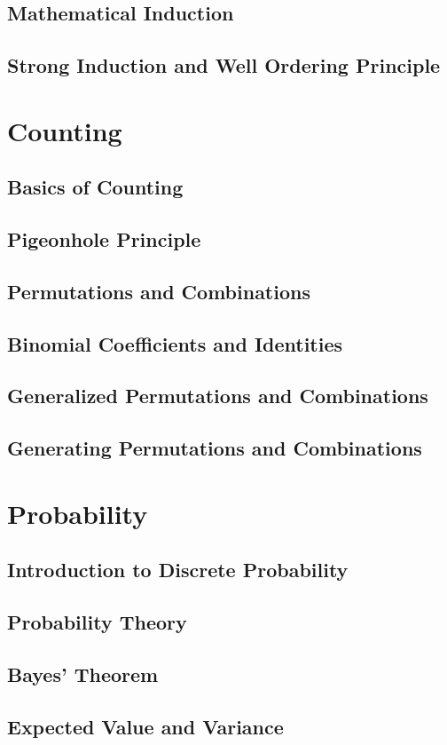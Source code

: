 \documentclass[article, 11pt]{article}
\theoremstyle{definition}
\begin{document}
    \subsection{Mathematical Induction}
    \subsection{Strong Induction and Well Ordering Principle}
    \section{Counting}
    \subsection{Basics of Counting}
    \subsection{Pigeonhole Principle}
    \subsection{Permutations and Combinations}
    \subsection{Binomial Coefficients and Identities}
    \subsection{Generalized Permutations and Combinations}
    \subsection{Generating Permutations and Combinations}
    \section{Probability}
    \subsection{Introduction to Discrete Probability}
    \subsection{Probability Theory}
    \subsection{Bayes' Theorem}
    \subsection{Expected Value and Variance} 
\end{document}

